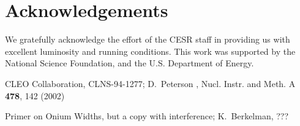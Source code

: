 \documentclass[aps,prd,preprint,superscriptaddress,tightenlines,nofootinbib,floatfix]{revtex4}
\begin{document}
%
\section{Acknowledgements}
%

We gratefully acknowledge the effort of the CESR staff in providing us
with excellent luminosity and running conditions.  This work was
supported by the National Science Foundation, and the U.S. Department
of Energy.

%
%

%
%
\def\endpoint{;~~}
\def\Journal#1&#2&#3(#4){#1{\bf #2}, #3 (#4)}
\def\NIM{Nucl. Instr. and Meth. }
\def\NIMA{Nucl. Instr. and Meth. A }
\def\NPB{Nucl. Phys. B }
\def\PLB{Phys. Lett. B }
\def\PRL{Phys. Rev. Lett. }
\def\PRD{Phys. Rev. D }
\newpage
\begin{thebibliography}{99}

     CLEO Collaboration, CLNS-94-1277; D.\ Peterson \etal, {\Journal\NIMA&478&142(2002)}

     Primer on Onium Widths, but a copy with interference; K.\ Berkelman, ???

\end{thebibliography}
\end{document}
